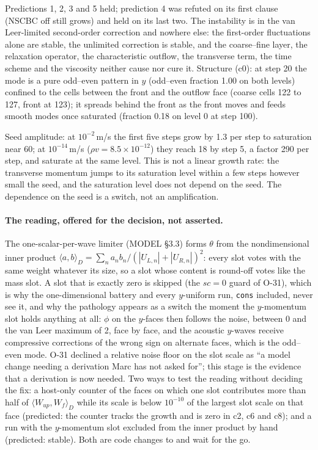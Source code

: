 \documentclass[11pt,a4paper]{article}
\newcommand{\code}[1]{\texttt{\small #1}}
\begin{document}
Predictions 1, 2, 3 and 5 held; prediction 4 was refuted on its first
clause (NSCBC off still grows) and held on its last two.  The instability
is in the van Leer-limited second-order correction and nowhere else: the
first-order fluctuations alone are stable, the unlimited correction is
stable, and the coarse--fine layer, the relaxation operator, the
characteristic outflow, the transverse term, the time scheme and the
viscosity neither cause nor cure it.  Structure (c0): at step 20 the mode
is a pure odd--even pattern in $y$ (odd--even fraction 1.00 on both
levels) confined to the cells between the front and the outflow face
(coarse cells 122 to 127, front at 123); it spreads behind the front as
the front moves and feeds smooth modes once saturated (fraction 0.18 on
level 0 at step 100).

Seed amplitude: at $10^{-2}$\,m/s the first five steps grow by 1.3 per
step to saturation near 60; at $10^{-14}$\,m/s ($\rho v = 8.5\times10^{-12}$)
they reach 18 by step 5, a factor 290 per step, and saturate at the same
level.  This is not a linear growth rate: the transverse momentum jumps
to its saturation level within a few steps however small the seed, and
the saturation level does not depend on the seed.  The dependence on the
seed is a switch, not an amplification.

\paragraph{The reading, offered for the decision, not asserted.}  The
one-scalar-per-wave limiter (MODEL \S3.3) forms $\theta$ from the
nondimensional inner product $\langle a,b\rangle_D = \sum_n a_n b_n /
(|U_{L,n}|+|U_{R,n}|)^2$: every slot votes with the same weight whatever
its size, so a slot whose content is round-off votes like the mass slot.
A slot that is exactly zero is skipped (the $sc = 0$ guard of O-31), which
is why the one-dimensional battery and every $y$-uniform run, \code{cons}
included, never see it, and why the pathology appears as a switch the
moment the $y$-momentum slot holds anything at all: $\phi$ on the
$y$-faces then follows the noise, between 0 and the van Leer maximum of
2, face by face, and the acoustic $y$-waves receive compressive
corrections of the wrong sign on alternate faces, which is the odd--even
mode.  O-31 declined a relative noise floor on the slot scale as ``a
model change needing a derivation Marc has not asked for''; this stage is
the evidence that a derivation is now needed.  Two ways to test the
reading without deciding the fix: a host-only counter of the faces on
which one slot contributes more than half of $\langle W_{up},W_f\rangle_D$
while its scale is below $10^{-10}$ of the largest slot scale on that
face (predicted: the counter tracks the growth and is zero in c2, c6 and
c8); and a run with the $y$-momentum slot excluded from the inner product
by hand (predicted: stable).  Both are code changes to 
and wait for the go.
\end{document}
